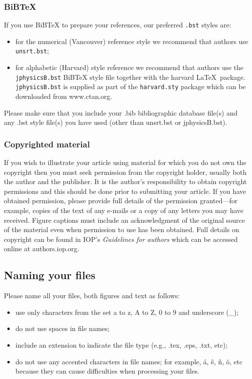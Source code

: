 \documentclass[12pt]{iopart}
\begin{document}
\subsubsection{\bf BiBTeX \label{bibby}}  If you use BiBTeX to prepare your
references, our preferred  \verb".bst" styles are: 

\begin{itemize}
\item for the numerical (Vancouver) reference style we recommend that authors use 
 \verb"unsrt.bst";
\item for alphabetic (Harvard) style reference we recommend that authors use
the \verb"jphysicsB.bst" BiBTeX style file together with the harvard \LaTeX\ package. 
\verb"jphysicsB.bst" is supplied as part of the \verb"harvard.sty" package which can be 
downloaded from www.ctan.org.
\end{itemize}

Please make sure that you include your .bib bibliographic database file(s) and any 
.bst style file(s) you have used (other than unsrt.bst or jphysicsB.bst).

\subsubsection{\bf Copyrighted material} If you wish to illustrate your article using material for which you do not own the copyright then you must seek permission from the copyright holder, usually both the author and the publisher. It is the author's responsibility to obtain copyright permissions and this should be done prior to submitting your article. If you have obtained permission, please provide full details of the permission granted---for example, copies of the text of any e-mails or a copy of any letters you may have received. Figure captions must include an acknowledgment of the original source of the material even when permission to use has been obtained. Full details on copyright can be found in IOP's {\it Guidelines for authors} which can be accessed online at authors.iop.org. 

\subsection{Naming your files}
Please name all your files, both figures and text as follows:
\begin{itemize}
\item use only characters from the set a to z, A to Z, 0 to 9 and underscore (\_); 
\item do not use spaces in file names;
\item include an extension to indicate the file type (e.g., .tex, .eps, .txt, etc);
\item do not use any accented characters in file names; for example, \'a, \^e, \~n, \"o, etc because 
they can cause difficulties when processing your files.
\end{itemize}
\end{document}
